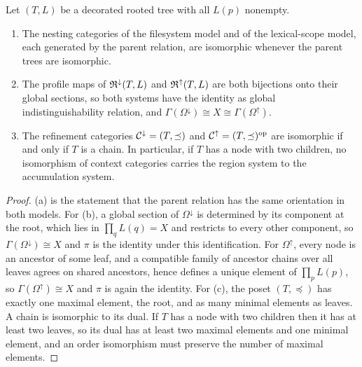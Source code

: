 \begin{proposition}\label{prop:orientation}
Let $(T,L)$ be a decorated rooted tree with all $L(p)$ nonempty.
\begin{enumerate}[label=(\alph*)]
\item The nesting categories of the filesystem model and of the lexical-scope model, each generated by the parent relation, are isomorphic whenever the parent trees are isomorphic.
\item The profile maps of $\mathfrak R^{\downarrow}(T,L)$ and $\mathfrak R^{\uparrow}(T,L)$ are both bijections onto their global sections, so both systems have the identity as global indistinguishability relation, and $\Gamma(\Omega^{\downarrow})\cong X\cong\Gamma(\Omega^{\uparrow})$.
\item The refinement categories $\mathcal C^{\downarrow}=(T,\preceq)$ and $\mathcal C^{\uparrow}=(T,\preceq)^{\mathrm{op}}$ are isomorphic if and only if $T$ is a chain. In particular, if $T$ has a node with two children, no isomorphism of context categories carries the region system to the accumulation system.
\end{enumerate}
\end{proposition}
\begin{proof}
(a) is the statement that the parent relation has the same orientation in both models. For (b), a global section of $\Omega^{\downarrow}$ is determined by its component at the root, which lies in $\prod_qL(q)=X$ and restricts to every other component, so $\Gamma(\Omega^{\downarrow})\cong X$ and $\pi$ is the identity under this identification. For $\Omega^{\uparrow}$, every node is an ancestor of some leaf, and a compatible family of ancestor chains over all leaves agrees on shared ancestors, hence defines a unique element of $\prod_pL(p)$, so $\Gamma(\Omega^{\uparrow})\cong X$ and $\pi$ is again the identity. For (c), the poset $(T,\preceq)$ has exactly one maximal element, the root, and as many minimal elements as leaves. A chain is isomorphic to its dual. If $T$ has a node with two children then it has at least two leaves, so its dual has at least two maximal elements and one minimal element, and an order isomorphism must preserve the number of maximal elements.
\end{proof}

